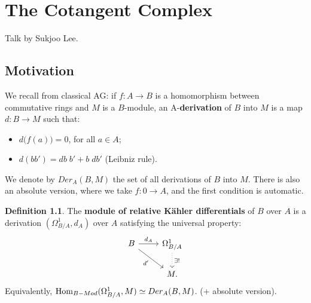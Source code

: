\documentclass[10pt,a4paper,reqno,oneside]{book} %
\theoremstyle{plain}
\theoremstyle{definition}
\newtheorem{defin}[thm]{Definition}
\theoremstyle{remark}
\numberwithin{equation}{section}
\begin{document}







\chapter{The Cotangent Complex}
Talk by Sukjoo Lee.

\section{Motivation}
\label{sect:cc_motivation}

We recall from classical AG: if $f:A \to B$ is a homomorphism between commutative rings and $M$ is a $B$-module, 
an A-\textbf{derivation} of $B$ into $M$ is a map $d : B \to M$ such that:
\begin{itemize}
\item $d\big( f(a)\big) = 0$, for all $a\in A$;
\item $d(bb') = db\; b' + b\; db'$ (Leibniz rule).
\end{itemize}
We denote by $Der_A(B,M)$ the set of all derivations of $B$ into $M$. There is also an absolute version, where
we take $f:0 \to A$, and the first condition is automatic.

\begin{defin}
The \textbf{module of relative K\"ahler differentials} of $B$ over $A$ is a derivation $(\Omega^{1}_{B/A}, d_A)$ 
over $A$ satisfying the universal property:
\[
\begin{tikzcd}
B \arrow{r}{d_A}\arrow[swap]{rd}{d'} & \Omega^1_{B/A}\arrow[dotted]{d}{\exists !} \\
 & M.
\end{tikzcd}
\]
Equivalently, $\operatorname{Hom}_{B-Mod}(\Omega^1_{B/A}, M) \simeq Der_A(B,M)$. (+ absolute version).
\end{defin}
\end{document}
